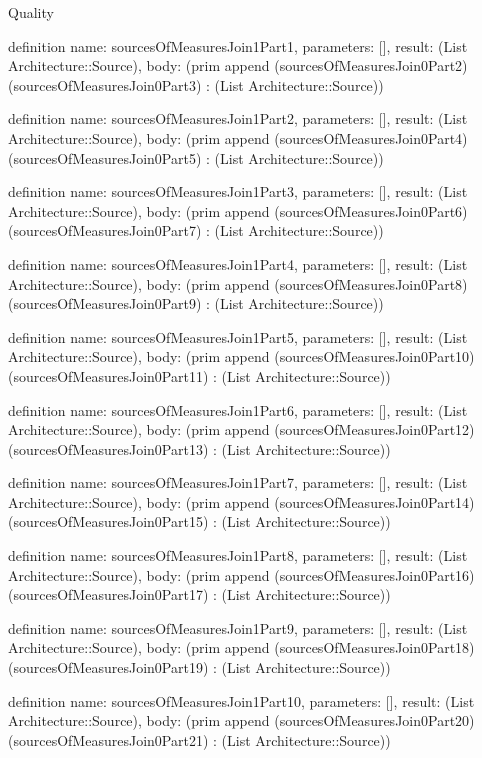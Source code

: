 \begin{lexlean}{Quality}
\begin{semanticmodule}
definition{
  name: sourcesOfMeasuresJoin1Part1,
  parameters: [],
  result: (List Architecture::Source),
  body: (prim append (sourcesOfMeasuresJoin0Part2) (sourcesOfMeasuresJoin0Part3) : (List Architecture::Source))
}

definition{
  name: sourcesOfMeasuresJoin1Part2,
  parameters: [],
  result: (List Architecture::Source),
  body: (prim append (sourcesOfMeasuresJoin0Part4) (sourcesOfMeasuresJoin0Part5) : (List Architecture::Source))
}

definition{
  name: sourcesOfMeasuresJoin1Part3,
  parameters: [],
  result: (List Architecture::Source),
  body: (prim append (sourcesOfMeasuresJoin0Part6) (sourcesOfMeasuresJoin0Part7) : (List Architecture::Source))
}

definition{
  name: sourcesOfMeasuresJoin1Part4,
  parameters: [],
  result: (List Architecture::Source),
  body: (prim append (sourcesOfMeasuresJoin0Part8) (sourcesOfMeasuresJoin0Part9) : (List Architecture::Source))
}

definition{
  name: sourcesOfMeasuresJoin1Part5,
  parameters: [],
  result: (List Architecture::Source),
  body: (prim append (sourcesOfMeasuresJoin0Part10) (sourcesOfMeasuresJoin0Part11) : (List Architecture::Source))
}

definition{
  name: sourcesOfMeasuresJoin1Part6,
  parameters: [],
  result: (List Architecture::Source),
  body: (prim append (sourcesOfMeasuresJoin0Part12) (sourcesOfMeasuresJoin0Part13) : (List Architecture::Source))
}

definition{
  name: sourcesOfMeasuresJoin1Part7,
  parameters: [],
  result: (List Architecture::Source),
  body: (prim append (sourcesOfMeasuresJoin0Part14) (sourcesOfMeasuresJoin0Part15) : (List Architecture::Source))
}

definition{
  name: sourcesOfMeasuresJoin1Part8,
  parameters: [],
  result: (List Architecture::Source),
  body: (prim append (sourcesOfMeasuresJoin0Part16) (sourcesOfMeasuresJoin0Part17) : (List Architecture::Source))
}

definition{
  name: sourcesOfMeasuresJoin1Part9,
  parameters: [],
  result: (List Architecture::Source),
  body: (prim append (sourcesOfMeasuresJoin0Part18) (sourcesOfMeasuresJoin0Part19) : (List Architecture::Source))
}

definition{
  name: sourcesOfMeasuresJoin1Part10,
  parameters: [],
  result: (List Architecture::Source),
  body: (prim append (sourcesOfMeasuresJoin0Part20) (sourcesOfMeasuresJoin0Part21) : (List Architecture::Source))
}


\end{semanticmodule}
\end{lexlean}
